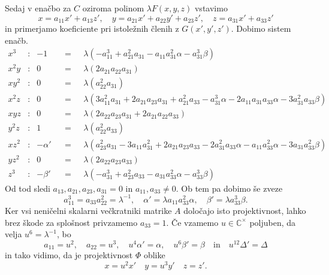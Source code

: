 \documentclass[mat1]{fmfdelo}
\newcommand{\CM}{\mathbb C ^\times}
\newcommand{\inv}{^{-1}}
\theoremstyle{definition}
\begin{document}
\begin{dokaz}
    Sedaj v enačbo za $C$ oziroma polinom $\lambda F(x,y,z)$ vstavimo 
    \[
        x = a_{11}x' + a_{13}z', \quad y = a_{21}x' + a_{22}y' + a_{23}z', \quad z = a_{31}x' + a_{33}z' 
    \]
    in primerjamo koeficiente pri istoležnih členih z $G(x', y', z')$. Dobimo sistem enačb.
    \begin{align*}
        x^3 &: & -1 && = \text{ }& \lambda (-a_{11}^3 + a_{21}^2 a_{31} - a_{11} a_{31}^2 \alpha - a_{31}^3 \beta) \\
        x^2y &: & 0 && = \text{ }& \lambda (2 a_{21} a_{22} a_{31}) \\
        xy^2 &: & 0 && = \text{ }& \lambda (a_{22}^2 a_{31}) \\
        x^2z &: & 0 && = \text{ }& \lambda (3 a_{11}^2 a_{31} + 2 a_{21} a_{23} a_{31} + a_{21}^2 a_{33} - 
        a_{31}^3 \alpha - 2 a_{11} a_{31} a_{33} \alpha - 3 a_{31}^2 a_{33} \beta) \\
        xyz  &: & 0 && = \text{ }& \lambda (2 a_{22} a_{23} a_{31} + 2 a_{21} a_{22} a_{33}) \\
        y^2z &: & 1 && = \text{ }& \lambda (a_{22}^2 a_{33}) \\
        xz^2 &: & -\alpha' && = \text{ }& \lambda (a_{23}^2 a_{31} - 3 a_{11} a_{31}^2 + 2 a_{21} a_{23} a_{33} - 
        2 a_{31}^2 a_{33} \alpha - a_{11} a_{33}^2 \alpha - 3 a_{31} a_{33}^2 \beta) \\
        yz^2 &: & 0 && = \text{ }& \lambda (2 a_{22} a_{23} a_{33} ) \\
        z^3 &: & -\beta' && = \text{ }& \lambda (-a_{31}^3 + a_{23}^2 a_{33} - a_{31} a_{33}^2 \alpha - a_{33}^3 \beta)
    \end{align*}
    Od tod sledi $a_{13}, a_{21}, a_{23}, a_{31} = 0$ in $a_{11}, a_{33} \neq 0$. Ob tem pa dobimo še zveze
    \[
        a_{11}^3 = a_{33}a_{22}^2 = \lambda\inv, \quad \alpha' = \lambda a_{11}a_{33}^2 \alpha, \quad \beta' = \lambda a_{33}^3 \beta.
    \]
    Ker vsi neničelni skalarni večkratniki matrike $A$ določajo isto projektivnost, lahko brez škode za splošnost privzamemo $a_{33} = 1$. Če vzamemo $u \in \CM$ poljuben, da velja $u^6 = \lambda\inv$, bo 
    \[
        a_{11} = u^2, \quad a_{22} = u^3, \quad u^4\alpha' = \alpha, \quad u^6 \beta' = \beta \quad \text{in} \quad u^{12} \Delta' = \Delta
    \]
    in tako vidimo, da je projektivnost $\Phi$ oblike
    \[
        x = u^2 x' \quad y = u^3 y' \quad z = z'.
    \]
\end{dokaz}
\end{document}
